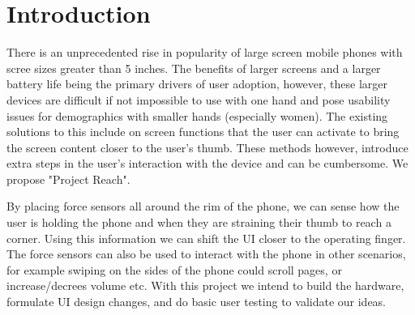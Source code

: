 \documentclass{sig-alternate}
\begin{document}

\maketitle
\begin{abstract}

\end{abstract}




\section{Introduction}
There is an unprecedented rise in popularity of large screen mobile phones with scree sizes greater than 5 inches. The benefits of larger screens and a larger battery life being the primary drivers of user adoption, however, these larger devices are difficult if not impossible to use with one hand and pose usability issues for demographics with smaller hands (especially women). The existing solutions to this include on screen functions that the user can activate to bring the screen content closer to the user's thumb. These methods however, introduce extra steps in the user's interaction with the device and can be cumbersome. We propose "Project Reach".
\par
By placing force sensors all around the rim of the phone, we can sense how the user is holding the phone and when they are straining their thumb to reach a corner. Using this information we can shift the UI closer to the operating finger. The force sensors can also be used to interact with the phone in other scenarios, for example swiping on the sides of the phone could scroll pages, or increase/decrees volume etc. With this project we intend to build the hardware, formulate UI design changes, and do basic user testing to validate our ideas.
\end{document}
